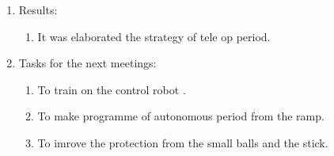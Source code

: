 \begin{enumerate}
	\item Results:
	\begin{enumerate}
		
		\item It was elaborated the strategy of tele op period.
		
	\end{enumerate}
	
	\item Tasks for the next meetings:
	\begin{enumerate}
		
		\item To train on the control robot .
		
		\item To make programme of autonomous period from the ramp.
		
		\item To imrove the protection from the small balls and the stick.
			
	\end{enumerate}
\end{enumerate}
\fillpage
